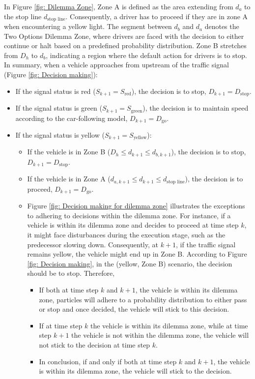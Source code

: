 In Figure \ref{fig: Dilemma Zone}, Zone A is defined as the area extending from $d_a$ to the stop line $d_\text{stop line}$. Consequently, a driver has to proceed if they are in zone A when encountering a yellow light. The segment between $d_b$ and $d_a$ denotes the Two Options Dilemma Zone, where drivers are faced with the decision to either continue or halt based on a predefined probability distribution. Zone B stretches from $D_h$ to $d_b$, indicating a region where the default action for drivers is to stop. In summary, when a vehicle approaches from upstream of the traffic signal (Figure \ref{fig: Decision making}):
\begin{itemize}
    \item If the signal status is red ($S_{k+1} = S_{\text{red}}$), the decision is to stop, $D_{k+1} = D_{\text{stop}}$.
    \item If the signal status is green ($S_{k+1} = S_{\text{green}}$), the decision is to maintain speed according to the car-following model, $D_{k+1} = D_{\text{go}}$.
    \item If the signal status is yellow ($S_{k+1} = S_{\text{yellow}}$):
    \begin{itemize}
        \item If the vehicle is in Zone B ($D_h \leq d_{k+1} \leq d_{b, k+1}$), the decision is to stop, $D_{k+1} = D_{\text{stop}}$.
        \item If the vehicle is in Zone A ($d_{a, k+1} \leq d_{k+1} \leq d_\text{stop line}$), the decision is to proceed, $D_{k+1} = D_{\text{go}}$. 
        \item Figure \ref{fig: Decision making for dilemma zone} illustrates the exceptions to adhering to decisions within the dilemma zone. For instance, if a vehicle is within its dilemma zone and decides to proceed at time step \(k\), it might face disturbances during the execution stage, such as the predecessor slowing down. Consequently, at \(k+1\), if the traffic signal remains yellow, the vehicle might end up in Zone B. According to Figure \ref{fig: Decision making}, in the (yellow, Zone B) scenario, the decision should be to stop. Therefore,
        \begin{itemize}
            \item If both at time step $k$ and $k+1$, the vehicle is within its dilemma zone, particles will adhere to a probability distribution to either pass or stop and once decided, the vehicle will stick to this decision.
            \item If at time step $k$ the vehicle is within its dilemma zone, while at time step $k+1$ the vehicle is not within the dilemma zone, the vehicle will not stick to the decision at time step $k$.
            \item In conclusion, if and only if both at time step $k$ and $k+1$, the vehicle is within its dilemma zone, the vehicle will stick to the decision.
        \end{itemize}
    \end{itemize} 
\end{itemize}

